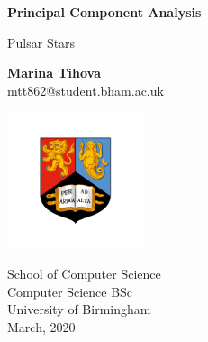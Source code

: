 \documentclass[a4paper,12pt]{article}
\begin{document}
    \begin{titlepage}
        \begin{center}
            \vspace*{2cm}

            \huge
            \textbf{Principal Component Analysis}

            \vspace{0.5cm}
            \LARGE
            Pulsar Stars

            \vspace{2cm}

            \textbf{Marina Tihova}\\
            mtt862@student.bham.ac.uk

            \vspace{1.5cm}

            \includegraphics[height=.3\textwidth, width=0.3\textwidth]{logo}

            \large
            School of Computer Science\\
            Computer Science BSc\\
            University of Birmingham\\
            March, 2020

        \end{center}
    \end{titlepage}

    \newpage

    \tableofcontents
    \newpage
\end{document}
